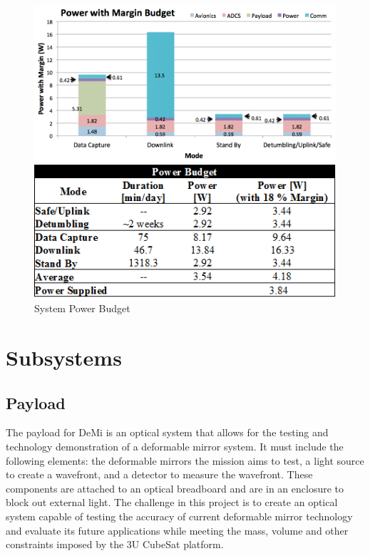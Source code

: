 \documentclass[12pt]{article}
\begin{document}
			
			\begin{figure}[!ht]
				\centering
				\includegraphics[width=5in]{images/MissionOverview_4.png}
				
				\includegraphics[width=5in]{images/MissionOverview_6.png}
				\caption{System Power Budget}
				\label{fig:Mission_power2}
			\end{figure}
\newpage			
\section{Subsystems}

\FloatBarrier

		\subsection{Payload}
The payload for DeMi is an optical system that allows for the testing
and technology demonstration of a deformable mirror system.  It must include the following  elements: the deformable mirrors the
mission aims to test, a light source to create a wavefront, and a detector to measure the wavefront.  These components are attached
to an optical breadboard and are in an enclosure to block out external
light.  The challenge in this project is to create an optical system capable of testing the accuracy of current deformable mirror technology and evaluate its future applications while meeting the mass, volume and other constraints imposed by the 3U CubeSat platform.
			
\end{document}
